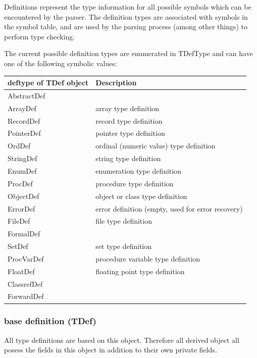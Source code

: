 \documentclass [a4paper,12pt]{article}
\begin{document}
Definitions represent the type information for all possible symbols which
can be encountered by the parser. The definition types are associated with
symbols in the symbol table, and are used by the parsing process (among
other things) to perform type checking.

The current possible definition types are enumerated in \textsf{TDefType}
and can have one of the following symbolic values:

\begin{longtable}{|l|p{10cm}|}
\hline
deftype of TDef object	& Description \\
\hline
\endhead
\hline
\endfoot
\textsf{AbstractDef}	&  \\
\textsf{ArrayDef}	& array type definition \\
\textsf{RecordDef}	& record type definition \\
\textsf{PointerDef}	& pointer type definition \\
\textsf{OrdDef}		& ordinal (numeric value) type definition \\
\textsf{StringDef}	& string type definition \\
\textsf{EnumDef}	& enumeration type definition \\
\textsf{ProcDef}	& procedure type definition \\
\textsf{ObjectDef}	& object or class type definition \\
\textsf{ErrorDef}	& error definition (empty, used for error recovery) \\
\textsf{FileDef}	& file type definition \\
\textsf{FormalDef}	&  \\
\textsf{SetDef}		& set type definition \\
\textsf{ProcVarDef}	& procedure variable type definition \\
\textsf{FloatDef}	& floating point type definition \\
\textsf{ClassrefDef}	&  \\
\textsf{ForwardDef}	&  \\
\end{longtable}

\subsubsection{base definition (TDef)}
\label{subsubsec:mylabel5}

All type definitions are based on this object. Therefore all derived object
all posess the fields in this object in addition to their own private
fields.
\end{document}
